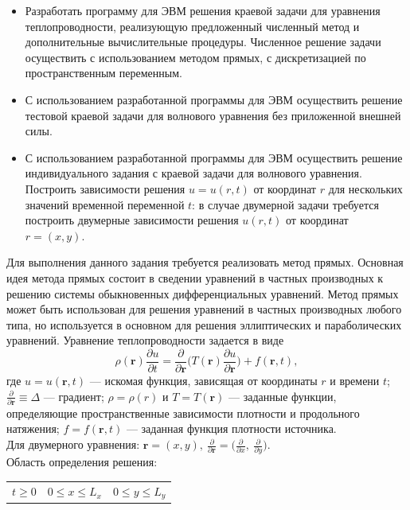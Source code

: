 \documentclass[a4paper,12pt]{article}
\begin{document}
\begin{itemize}
	\item Разработать программу для ЭВМ решения краевой задачи для уравнения теплопроводности, реализующую предложенный численный метод и дополнительные вычислительные процедуры. Численное решение задачи осуществить с использованием методом прямых, с дискретизацией по пространственным переменным. 

	\item  С использованием разработанной программы для ЭВМ осуществить решение тестовой краевой задачи
	для волнового уравнения без приложенной внешней силы.
	\item С использованием разработанной программы для ЭВМ осуществить решение индивидуального задания с краевой задачи для волнового уравнения. Построить зависимости решения $u = u(r, t)$ от координат
	$r$ для нескольких значений временной переменной $t$: в случае двумерной задачи требуется построить
	двумерные зависимости решения $u(r, t)$ от координат $r = (x, y)$. 
\end{itemize}
Для выполнения данного задания требуется реализовать метод прямых. Основная идея метода прямых состоит в сведении уравнений в частных производных к решению системы обыкновенных дифференциальных уравнений. Метод прямых может быть использован для решения уравнений в частных производных любого типа, но используется в основном для решения эллиптических и параболических уравнений.
Уравнение теплопроводности задается в виде
\begin{equation}
  \rho(\textbf{r}) \displaystyle \frac{\partial u}{\partial t} = \displaystyle \frac{\partial}{\partial \textbf{r}} \biggl( T(\textbf{r}) \displaystyle \frac{\partial u}{\partial \textbf{r}}\biggl) + f(\textbf{r}, t) ,
\end{equation}
где $u = u(\textbf{r}, t)$ — искомая функция, зависящая от координаты $r$ и времени $t$; $\displaystyle \frac{\partial }{\partial \textbf{r}} \equiv \Delta$ — градиент; $\rho = \rho(r)$
и $T = T (\textbf{r})$ — заданные функции, определяющие пространственные зависимости плотности и продольного натяжения; $f = f(\textbf{r}, t)$ — заданная функция плотности источника.
\\
Для двумерного уравнения: $\textbf{r} = (x, y), \ \displaystyle  \frac{\partial }{\partial \textbf{r}} = \biggl(\frac{\partial }{\partial x},\  \frac{\partial }{\partial y} \biggl)$.\\
Область определения решения:
\begin{center}
	\begin{tabular}{c c c }
		$	t \geq 0 $&
		$	0 \leq x \leq L_x $&
		$	0 \leq y \leq L_y$
	\end{tabular}
\end{center}
\end{document}
